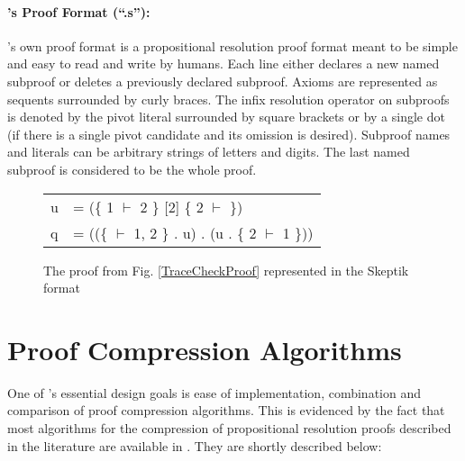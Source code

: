 \documentclass{llncs}
\begin{document}
\vspace{-5pt}

\paragraph{{\skeptik}'s Proof Format (``.s''): }

{\skeptik}'s own proof format is a propositional resolution proof format meant to be simple and easy to read and write by humans. Each line either declares a new named subproof or deletes a previously declared subproof. Axioms are represented as sequents surrounded by curly braces. The infix resolution operator on
subproofs is denoted by the pivot literal surrounded by square brackets or by a single dot (if there is a single pivot candidate and its omission is desired). Subproof names and literals can be arbitrary strings of letters and digits. The last named subproof is considered to be the whole proof.

\vspace{-10pt}

\begin{figure}
  \centering
  \begin{tabular}{ll}
    u &= (\{ 1 $\vdash$ 2 \} [2] \{ 2 $\vdash$ \}) \\
    q &= ((\{ $\vdash$ 1, 2 \} . u) . (u . \{ 2 $\vdash$ 1 \}))
  \end{tabular}
  \caption{The proof from Fig. \ref{TraceCheckProof} represented in the Skeptik format}
  \label{SkeptikProof}
\end{figure}

\vspace{-10pt}


\newcommand{\pskip}{\vspace{-3pt}}

\pskip

\section{Proof Compression Algorithms}

One of {\skeptik}'s essential design goals is ease of implementation, combination and comparison of proof compression algorithms. This is evidenced by the fact that most algorithms for the compression of propositional resolution proofs described in the literature are available in {\skeptik}. They are shortly described below:

\pskip
\end{document}
